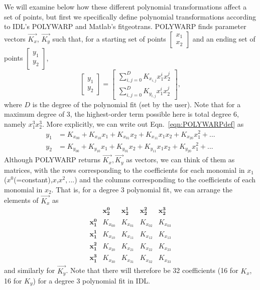 \documentclass[11pt]{article}
\begin{document}
We will examine below how these different polynomial transformations affect a set of points, but first we specifically define polynomial transformations according to IDL's POLYWARP and Matlab's fitgeotrans.  POLYWARP finds parameter vectors $\vec{K_x}$, $\vec{K_y}$ such that, for a starting set of points $\left[\begin{smallmatrix} x_1\\ x_2\end{smallmatrix} \right]$ and an ending set of points $\left[\begin{smallmatrix} y_1\\ y_2\end{smallmatrix} \right]$,
\begin{equation}
       \left[   \begin{matrix} 
          y_1 \\
          y_2
          \end{matrix} \right] = \left[ \begin{matrix}
          			\sum_{i,j=0}^D K_{x_{i,j}} x_1^ix_2^j\\
				\sum_{i,j=0}^D K_{y_{i,j}} x_1^ix_2^j
				 \end{matrix} \right], \label{eqn:POLYWARPdef}
\end{equation}
where $D$ is the degree of the polynomial fit (set by the user). Note that for a maximum degree of 3, the highest-order term possible here is total degree 6, namely $x_1^3x_2^3$.  More explicitly, we can write out Eqn.~\eqref{eqn:POLYWARPdef} as 
\begin{align}
y_1 &= K_{x_{00}} + K_{x_{10}}x_1+K_{x_{01}}x_2+K_{x_{11}}x_1x_2+K_{x_{20}}x_1^2+...\\
y_2 &= K_{y_{00}} + K_{y_{10}}x_1+K_{y_{01}}x_2+K_{y_{11}}x_1x_2+K_{y_{20}}x_1^2+...
\end{align}
Although POLYWARP returns $\vec{K_x},\vec{K_y}$ as vectors, we can think of them as matrices, with the rows corresponding to the coefficients for each monomial in $x_1$ ($x^0$(=constant),$x$,$x^2,...$) and the columns corresponding to the coefficients of each monomial in $x_2$.  That is, for a degree 3 polynomial fit, we can arrange the elements of $\vec{K_x}$ as
\begin{equation}
 \begin{matrix} 
            & \mathbf{x_2^0}         & \mathbf{x_2^1} & \mathbf{x_2^2}  & \mathbf{x_2^3} \\
\mathbf{x_1^0} & K_{x_{00}} & K_{x_{01}} & K_{x_{02}} & K_{x_{03}} \\
\mathbf{x_1^1} & K_{x_{10}} & K_{x_{11}} & K_{x_{12}} & K_{x_{13}} \\
\mathbf{x_1^2} & K_{x_{20}} & K_{x_{21}} & K_{x_{22}} & K_{x_{23}} \\
\mathbf{x_1^3} & K_{x_{30}} & K_{x_{31}} & K_{x_{32}} & K_{x_{33}}
\end{matrix} 
\end{equation}
and similarly for $\vec{K_y}$.  Note that there will therefore be 32 coefficients (16 for $K_x$, 16 for $K_y$) for a degree 3 polynomial fit in IDL.
\end{document}
